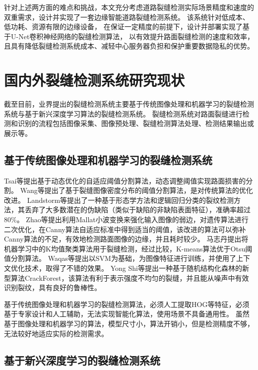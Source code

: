针对上述两方面的难点和挑战，本文充分考虑道路裂缝检测实际场景精度和速度的双重需求，设计并实现了一套边缘智能道路裂缝检测系统。
该系统针对低成本、低功耗、资源有限的边缘设备，
在保证一定精度的前提下，设计并部署实现了基于U-Net卷积神经网络的裂缝检测算法，
以有效提升路面裂缝检测的速度和效率，且具有降低裂缝检测系统成本、减轻中心服务器负担和保护重要数据隐私的优势。

\section{国内外裂缝检测系统研究现状}
截至目前，业界提出的裂缝检测系统主要基于传统图像处理和机器学习的裂缝检测系统与基于新兴深度学习算法的裂缝检测系统。
裂缝检测系统对路面裂缝进行检测和识别的流程包括图像采集、图像预处理、裂缝检测算法处理、检测结果输出或展示等。

\subsection{基于传统图像处理和机器学习的裂缝检测系统}

Tsai等提出基于动态优化的自适应阈值分割算法，动态调整阈值实现路面损害的分割。
Wang等提出了基于裂缝图像密度分布的阈值分割算法，是对传统算法的优化改进。
Landstorm等提出了一种基于形态学方法和逻辑回归分类的裂纹检测方法，其丢弃了大多数潜在的伪缺陷（类似于缺陷的非缺陷表面特征），准确率超过80\%。
Zhao等提出利用Mallat小波变换来强化输入图像的弱边，对遗传算法进行二次优化，在Canny算法自适应标准中得到适当的阈值，该改进的算法可以弥补Canny算法的不足，有效地检测路面图像的边缘，并且耗时较少。
马志丹提出将机器学习中的K均值聚类算法用于裂缝检测，经过比较，K-means算法优于Otsu阈值分割算法。
Waqas等提出以SVM为基础，为图像特征进行训练，并使用了上下文优化技术，取得了不错的效果。
Yong Shi等提出一种基于随机结构化森林的新型算法CrackForest，该算法有利于表示强度不均匀的裂缝，并且能从噪声中有效识别裂纹，具有良好的鲁棒性。

基于传统图像处理和机器学习的裂缝检测算法，必须人工提取HOG等特征，必须基于专家设计和人工辅助，无法实现智能化算法，使用场景不具备通用性。
虽然基于图像处理和机器学习的算法，模型尺寸小，算法开销小，但是检测精度不够，无法较好地适应实际的检测需求。

\subsection{基于新兴深度学习的裂缝检测系统}

